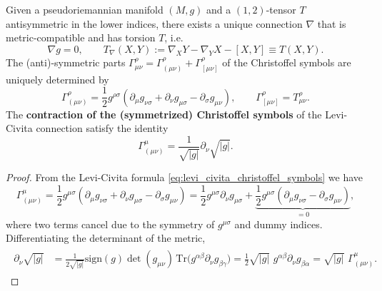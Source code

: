 \documentclass[../geometry_main.tex]{subfiles}
\begin{document}
\begin{mytheorem}
Given a pseudoriemannian manifold \((M,g)\) and a $(1,2)$-tensor $T$ antisymmetric in the lower indices, there exists a unique connection \(\nabla\) that is metric-compatible and has torsion \(T\), i.e. 
\begin{equation}
    \nabla g = 0,  \qquad T_\nabla(X,Y):=\nabla_XY-\nabla_YX-[X,Y]\equiv T(X,Y).
\end{equation}
The (anti)-symmetric parts $\Gamma_{\mu\nu}^\rho=\Gamma^\rho_{(\mu\nu)}+\Gamma^\rho_{[\mu\nu]}$ of the Christoffel symbols are uniquely determined by 
\begin{equation}\label{eq:levi_civita_christoffel_symbols}
    \Gamma^\rho_{(\mu\nu)}= \frac{1}{2} g^{\rho \sigma} \left( \partial_{\mu} g_{\nu \sigma} + \partial_{\nu} g_{\mu \sigma} - \partial_{\sigma} g_{\mu \nu} \right), \qquad 
    \Gamma^\rho_{[\mu\nu]}= T_{\mu \nu}^{\rho}.
\end{equation}
%
The \textbf{contraction of the (symmetrized) Christoffel symbols} of the Levi-Civita connection satisfy the identity
\begin{equation}\label{eq:metric_christoffel_contraction_identity}
    \Gamma^{\mu}_{(\mu \nu)} = \frac{1}{\sqrt{|g|}} \partial_{\nu} \sqrt{|g|}.
\end{equation}   
\end{mytheorem}
\begin{proof}
From the Levi-Civita formula \eqref{eq:levi_civita_christoffel_symbols} we have
\begin{equation}
    \Gamma^{\mu}_{(\mu \nu)} = \frac{1}{2} g^{\mu \sigma} \left( \partial_{\mu} g_{\nu \sigma} + \partial_{\nu} g_{\mu \sigma} - \partial_{\sigma} g_{\mu \nu} \right)
    = \frac{1}{2} g^{\mu \sigma} \partial_{\nu} g_{\mu \sigma} + \underbrace{\frac{1}{2} g^{\mu \sigma} \left( \partial_{\mu} g_{\nu \sigma} - \partial_{\sigma} g_{\mu \nu} \right)}_{=0},
\end{equation}
where two terms cancel due to the symmetry of \(g^{\mu \sigma}\) and dummy indices.
Differentiating the determinant of the metric, 
\begin{align}
\begin{aligned}
    \partial_{\nu} \sqrt{|g|} &= \frac{1}{2 \sqrt{|g|}} \text{sign}(g) \det(g_{\mu \nu}) \, \text{Tr}\big(g^{\alpha \beta} \partial_{\nu} g_{\beta \gamma}\big)
    = \frac{1}{2} \sqrt{|g|}\,\, g^{\alpha \beta} \partial_{\nu} g_{\beta \alpha}
    = \sqrt{|g|} \,\,\Gamma^{\mu}_{(\mu \nu)}.
\end{aligned}
\end{align}
\end{proof}
\end{document}
